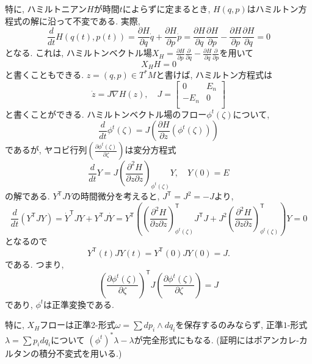 \documentclass[a4paper]{ujarticle}
\numberwithin{equation}{section}
\theoremstyle{definition}
\begin{document}
        特に, ハミルトニアン$H$が時間$t$によらずに定まるとき, $H(q, p)$はハミルトン方程式の解に沿って不変である.
        実際,
        \[
            \frac{d}{d t} H(q(t), p(t)) = \frac{\partial H}{\partial q} \dot{q} + \frac{\partial H}{\partial p} \dot{p} = \frac{\partial H}{\partial q} \frac{\partial H}{\partial p} - \frac{\partial H}{\partial p} \frac{\partial H}{\partial q} = 0
        \] 
        となる. これは, ハミルトンベクトル場$X_H = \frac{\partial H}{\partial p} \frac{\partial}{\partial q} - \frac{\partial H}{\partial q} \frac{\partial}{\partial p}$を用いて
        \[
            X_H H = 0
        \]
        と書くこともできる. 
        $z = (q, p) \in T^{*}M$と書けば, ハミルトン方程式は
        \[
            \dot{z} = J \nabla H(z), 
            \quad J = 
            \begin{bmatrix}
                0 & E_n \\
                -E_n & 0 \\
            \end{bmatrix}
        \]
        と書くことができる.
        ハミルトンベクトル場のフロー$\phi^{t}(\zeta)$について,
        \[
            \frac{d}{d t} \phi^{t}(\zeta) = J \left(\frac{\partial H}{\partial z}(\phi^{t}(\zeta))\right) 
        \] 
        であるが,
        ヤコビ行列$\displaystyle \left( \frac{\partial \phi^{t}(\zeta)}{\partial \zeta} \right)$は変分方程式
        \[
            \frac{d}{d t} Y = J \left(\frac{\partial^2 H}{\partial z \partial z}\right)_{\phi^{t}(\zeta)} Y, \quad Y(0) = E
        \]
        の解である. 
        $Y^{\mathsf{T}} J Y$の時間微分を考えると, $J^{\mathsf{T}} = J^2 = - J$より,
        \[
            \frac{d}{d t}(Y^{\mathsf{T}} J Y) = \dot{Y}^{\mathsf{T}} J Y + Y^{\mathsf{T}} J \dot{Y} = Y^{\mathsf{T}}(\left(\frac{\partial^2 H}{\partial z \partial z}\right)_{\phi^{t}(\zeta)}^{\mathsf{T}} J^{\mathsf{T}}J + J^2 \left(\frac{\partial^2 H}{\partial z \partial z}\right)_{\phi^{t}(\zeta)}^{\mathsf{T}} )Y = 0
        \]
        となるので
        \[
            Y^{\mathsf{T}}(t) J Y(t) = Y^{\mathsf{T}}(0) J Y(0) = J.
        \]
        である. つまり,
        \[
            \left( \frac{\partial \phi^{t}(\zeta)}{\partial \zeta} \right)^{\mathsf{T}} J \left( \frac{\partial \phi^{t}(\zeta)}{\partial \zeta} \right) = J
        \]
        であり, $\phi^{t}$は正準変換である.

        特に, $X_H$フローは正準$2$-形式$\omega = \sum dp_i \wedge dq_i$を保存するのみならず, 
        正準$1$-形式$\lambda = \sum p_i d q_i$について
        $(\phi^{t})^{*}\lambda - \lambda$が完全形式にもなる. (証明にはポアンカレ-カルタンの積分不変式を用いる.)
\end{document}
